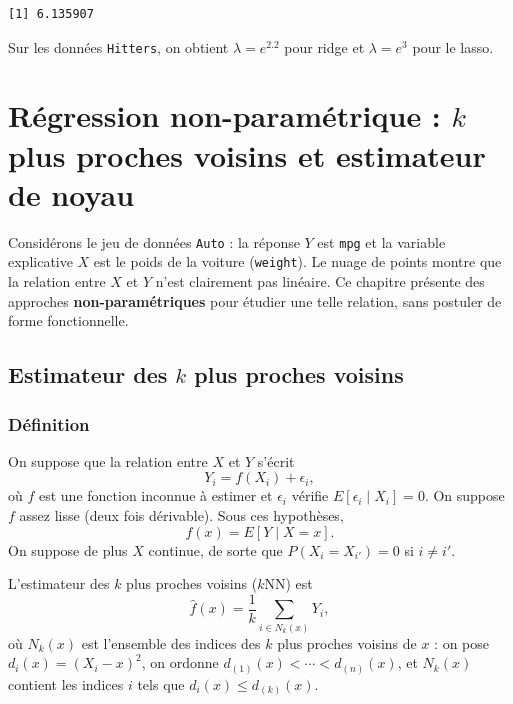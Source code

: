 \documentclass[
  french,
  letterpaper,
  DIV=11,
  numbers=noendperiod]{scrreprt}
\begin{document}
\begin{verbatim}
[1] 6.135907
\end{verbatim}

Sur les données \texttt{Hitters}, on obtient \(\lambda = e^{2.2}\) pour
ridge et \(\lambda = e^3\) pour le lasso.


\chapter{\texorpdfstring{Régression non-paramétrique : \(k\) plus
proches voisins et estimateur de
noyau}{Régression non-paramétrique : k plus proches voisins et estimateur de noyau}}\label{sec-knn}

Considérons le jeu de données \texttt{Auto} : la réponse \(Y\) est
\texttt{mpg} et la variable explicative \(X\) est le poids de la voiture
(\texttt{weight}). Le nuage de points montre que la relation entre \(X\)
et \(Y\) n'est clairement pas linéaire. Ce chapitre présente des
approches \textbf{non-paramétriques} pour étudier une telle relation,
sans postuler de forme fonctionnelle.

\section{\texorpdfstring{Estimateur des \(k\) plus proches
voisins}{Estimateur des k plus proches voisins}}\label{estimateur-des-k-plus-proches-voisins}

\subsection{Définition}\label{duxe9finition-1}

On suppose que la relation entre \(X\) et \(Y\) s'écrit
\[Y_i = f(X_i) + \epsilon_i,\] où \(f\) est une fonction inconnue à
estimer et \(\epsilon_i\) vérifie \(E[\epsilon_i\mid X_i] = 0\). On
suppose \(f\) assez lisse (deux fois dérivable). Sous ces hypothèses,
\[f(x) = E[Y\mid X = x].\] On suppose de plus \(X\) continue, de sorte
que \(P(X_i = X_{i'}) = 0\) si \(i\neq i'\).

L'estimateur des \(k\) plus proches voisins (\(k\)NN) est
\[\hat f(x) = \frac{1}{k}\sum_{i\in N_k(x)} Y_i,\] où \(N_k(x)\) est
l'ensemble des indices des \(k\) plus proches voisins de \(x\) : on pose
\(d_i(x) = (X_i - x)^2\), on ordonne
\(d_{(1)}(x) < \cdots < d_{(n)}(x)\), et \(N_k(x)\) contient les indices
\(i\) tels que \(d_i(x) \leq d_{(k)}(x)\).
\end{document}
